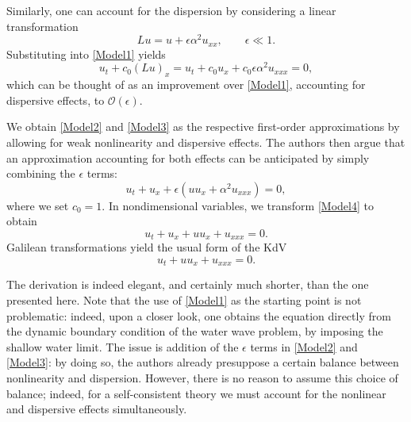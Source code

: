 Similarly, one can account for the dispersion by considering a linear transformation
\[ Lu = u + \epsilon \alpha^2 u_{xx}, \qquad \epsilon \ll 1.\]
Substituting into \eqref{Model1} yields
\begin{equation}\label{Model3}
u_t + c_0 (Lu)_x= u_t + c_0 u_x + c_0 \epsilon \alpha^2 u_{xxx}  = 0, 
\end{equation}
which can be thought of as an improvement over \eqref{Model1}, accounting for dispersive effects, to $\mathcal{O}(\epsilon).$ 

We obtain \eqref{Model2} and \eqref{Model3} as the respective first-order approximations by allowing for weak nonlinearity and dispersive effects. The authors then argue that an approximation accounting for both effects can be anticipated by simply combining the $\epsilon$ terms:
\begin{equation}\label{Model4}
u_t + u_x + \epsilon(u u_x + \alpha^2 u_{xxx}) = 0,
\end{equation} 
where we set $c_0 =1.$ In nondimensional variables, we transform \eqref{Model4} to obtain 
\[ u_t + u_x + uu_x + u_{xxx} = 0.\] 
Galilean transformations yield the usual form of the KdV 
\[ u_t +uu_x + u_{xxx} = 0. \]

The derivation is indeed elegant, and certainly much shorter, than the one presented here. Note that the use of \eqref{Model1} as the starting point is not problematic: indeed, upon a closer look, one obtains the equation directly from the dynamic boundary condition of the water wave problem, by imposing the shallow water limit. The issue is addition of the $\epsilon$ terms in \eqref{Model2} and \eqref{Model3}: by doing so, the authors already presuppose a certain balance between nonlinearity and dispersion. However, there is no reason to assume this choice of balance; indeed, for a self-consistent theory we must account for the nonlinear and dispersive effects simultaneously. 
